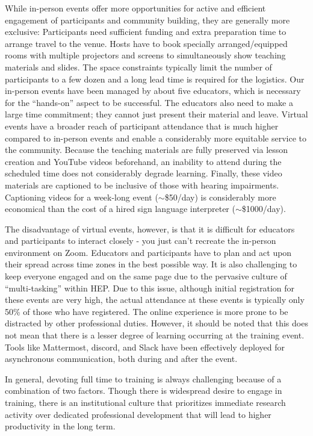 \documentclass[twocolumn]{svjour3}          %
\begin{document}
While in-person events offer more opportunities for active and efficient engagement of participants and community building, they are generally more exclusive: Participants need sufficient funding and extra preparation time to arrange travel to the venue. Hosts have to book specially arranged/equipped rooms with multiple projectors and screens to simultaneously show teaching materials and slides. The space constraints typically limit the number of participants to a few dozen and a long lead time is required for the logistics. 
Our in-person events have been managed by about five educators, which is necessary for the \enquote{hands-on} aspect to be successful. The educators also need to make a large time commitment; they cannot just present their material and leave.
Virtual events have a broader reach of participant attendance that is much higher compared to in-person events and enable a considerably more equitable service to the community. Because the teaching materials are fully preserved via lesson creation and YouTube videos beforehand, an inability to attend during the scheduled time does not considerably degrade learning.  Finally, these video materials are captioned to be inclusive of those with hearing impairments. Captioning videos for a week-long event ($\sim$\$50/day) is considerably more economical than the cost of a hired sign language interpreter ($\sim$\$1000/day). 

The disadvantage of virtual events, however, is that it is difficult for educators and participants to interact closely - you just can’t recreate the in-person environment on Zoom. Educators and participants have to plan and act upon their spread across time zones in the best possible way. It is also challenging to keep everyone engaged and on the same page due to the pervasive culture of \enquote{multi-tasking} within HEP. Due to this issue, although initial registration for these events are very high, the actual attendance at these events is typically only 50\% of those who have registered. The online experience is more prone to be distracted by other professional duties. 
However, it should be noted that this does not mean that there is a lesser degree of learning occurring at the training event. Tools like Mattermost, discord, and Slack have been effectively deployed for asynchronous communication, both during and after the event.

In general, devoting full time to training is always challenging because of a combination of two factors.  Though there is widespread desire to engage in training, there is an institutional culture that prioritizes immediate research activity over dedicated professional development that will lead to higher productivity in the long term.
%
\end{document}
